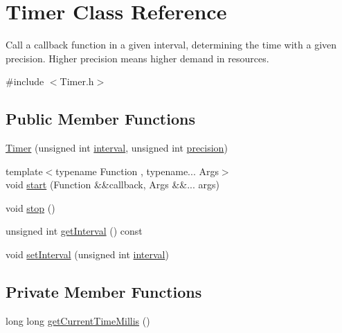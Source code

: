 \hypertarget{class_timer}{}\section{Timer Class Reference}
\label{class_timer}


Call a callback function in a given interval, determining the time with a given precision. Higher precision means higher demand in resources.  




{\ttfamily \#include $<$Timer.\+h$>$}

\subsection*{Public Member Functions}
\begin{DoxyCompactItemize}
\item 
\hyperlink{class_timer_a5b659c4fb572c549dad183a7b32b08df}{Timer} (unsigned int \hyperlink{class_timer_aaf9bce1286b714658a0f4484d8fee960}{interval}, unsigned int \hyperlink{class_timer_a0eb4723e5856ae2180081af68980d1dc}{precision})
\item 
{\footnotesize template$<$typename Function , typename... Args$>$ }\\void \hyperlink{class_timer_adcf70b5065e31461e27309c96065437a}{start} (Function \&\&callback, Args \&\&... args)
\item 
void \hyperlink{class_timer_a63f0eb44b27402196590a03781515dba}{stop} ()
\item 
unsigned int \hyperlink{class_timer_a6cbb88b5073d95fd871a012966005618}{get\+Interval} () const
\item 
void \hyperlink{class_timer_a0b24293bfc154f7432b1c52ac857d853}{set\+Interval} (unsigned int \hyperlink{class_timer_aaf9bce1286b714658a0f4484d8fee960}{interval})
\end{DoxyCompactItemize}
\subsection*{Private Member Functions}
\begin{DoxyCompactItemize}
\item 
long long \hyperlink{class_timer_a39a332f8ce3a45ed8d78c772755342c8}{get\+Current\+Time\+Millis} ()
\end{DoxyCompactItemize}
